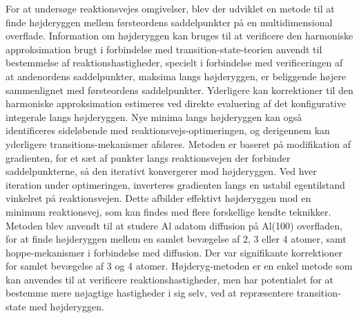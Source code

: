 For at undersøge reaktionsvejes omgivelser, blev der udviklet en metode til at finde højderyggen mellem førsteordens saddelpunkter på en multidimensional overflade.
Information om højderyggen kan bruges til at verificere den harmoniske approksimation brugt i forbindelse med transition-state-teorien anvendt til bestemmelse af reaktionshastigheder, specielt i forbindelse med verificeringen af at andenordens saddelpunkter, maksima langs højderyggen, er beliggende højere sammenlignet med førsteordens saddelpunkter.
Yderligere kan korrektioner til den harmoniske approksimation estimeres ved direkte evaluering af det konfigurative integerale langs højderyggen.
Nye minima langs højderyggen kan også identificeres sideløbende med reaktionsvejs-optimeringen, og derigennem kan yderligere transitions-mekanismer afsløres.
Metoden er baseret på modifikation af gradienten, for et sæt af punkter langs reaktionsvejen der forbinder saddelpunkterne, så den iterativt konvergerer mod højderyggen.
Ved hver iteration under optimeringen, inverteres gradienten langs en ustabil egentilstand vinkelret på reaktionsvejen. Dette afbilder effektivt højderyggen mod en minimum reaktionsvej, som kan findes med flere forskellige kendte teknikker.
Metoden blev anvendt til at studere Al adatom diffusion på Al(100) overfladen, for at finde højderyggen mellem en samlet bevægelse af 2, 3 eller 4 atomer, samt hoppe-mekanismer i forbindelse med diffusion.
Der var signifikante korrektioner for samlet bevægelse af 3 og 4 atomer. 
Højderyg-metoden er en enkel metode som kan anvendes til at verificere reaktionshastigheder, men har potentialet for at bestemme mere nøjagtige hastigheder i sig selv, ved at repræsentere transition-state med højderyggen.



